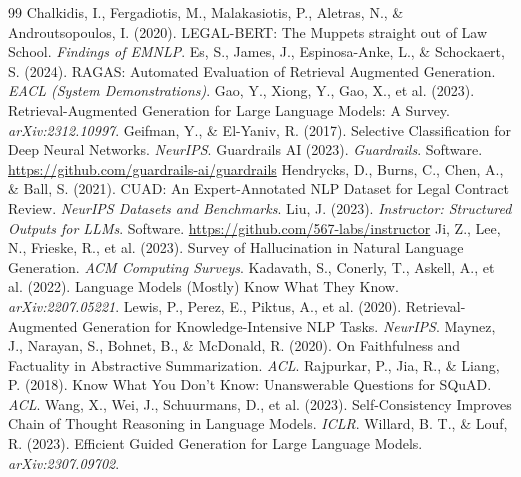\documentclass[11pt]{article}
\begin{document}
\begin{thebibliography}{99}
 Chalkidis, I., Fergadiotis, M., Malakasiotis, P., Aletras, N., \& Androutsopoulos, I. (2020). LEGAL-BERT: The Muppets straight out of Law School. \emph{Findings of EMNLP}.
 Es, S., James, J., Espinosa-Anke, L., \& Schockaert, S. (2024). RAGAS: Automated Evaluation of Retrieval Augmented Generation. \emph{EACL (System Demonstrations)}.
 Gao, Y., Xiong, Y., Gao, X., et al. (2023). Retrieval-Augmented Generation for Large Language Models: A Survey. \emph{arXiv:2312.10997}.
 Geifman, Y., \& El-Yaniv, R. (2017). Selective Classification for Deep Neural Networks. \emph{NeurIPS}.
 Guardrails AI (2023). \emph{Guardrails}. Software. \url{https://github.com/guardrails-ai/guardrails}
 Hendrycks, D., Burns, C., Chen, A., \& Ball, S. (2021). CUAD: An Expert-Annotated NLP Dataset for Legal Contract Review. \emph{NeurIPS Datasets and Benchmarks}.
 Liu, J. (2023). \emph{Instructor: Structured Outputs for LLMs}. Software. \url{https://github.com/567-labs/instructor}
 Ji, Z., Lee, N., Frieske, R., et al. (2023). Survey of Hallucination in Natural Language Generation. \emph{ACM Computing Surveys}.
 Kadavath, S., Conerly, T., Askell, A., et al. (2022). Language Models (Mostly) Know What They Know. \emph{arXiv:2207.05221}.
 Lewis, P., Perez, E., Piktus, A., et al. (2020). Retrieval-Augmented Generation for Knowledge-Intensive NLP Tasks. \emph{NeurIPS}.
 Maynez, J., Narayan, S., Bohnet, B., \& McDonald, R. (2020). On Faithfulness and Factuality in Abstractive Summarization. \emph{ACL}.
 Rajpurkar, P., Jia, R., \& Liang, P. (2018). Know What You Don't Know: Unanswerable Questions for SQuAD. \emph{ACL}.
 Wang, X., Wei, J., Schuurmans, D., et al. (2023). Self-Consistency Improves Chain of Thought Reasoning in Language Models. \emph{ICLR}.
 Willard, B. T., \& Louf, R. (2023). Efficient Guided Generation for Large Language Models. \emph{arXiv:2307.09702}.
\end{thebibliography}
\end{document}
